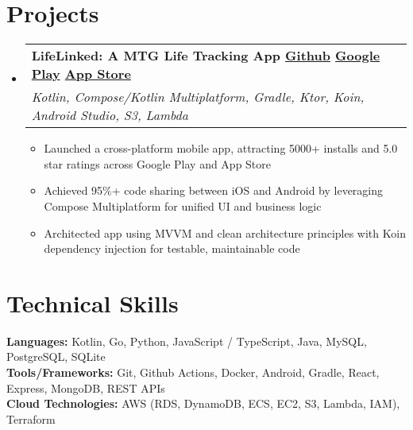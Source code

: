 \documentclass[letterpaper,11pt]{article}
\makeatletter
\newcommand\tab[1][1cm]{\hspace*{#1}}
\newcommand{\resumeItem}[1]{
  \item\small{
    {#1 \vspace{-2.pt}}
  }
}
\newcommand{\resumeSubheading}[4]{
  \vspace{-3pt}\item
    \begin{tabular*}{0.97\textwidth}[t]{l@{\extracolsep{\fill}}r}
    \vspace{-2pt}
      \textbf{#1} & \textit{#2} \\
      \textit{\small#3} & \textit{\small #4} \\
    \end{tabular*}\vspace{-7pt}
}
\newcommand{\resumeSubHeadingListStart}{\begin{itemize}[leftmargin=0.15in, label={}]}
\newcommand{\resumeSubHeadingListEnd}{\end{itemize}}
\newcommand{\resumeItemListStart}{\begin{itemize}}
\newcommand{\resumeItemListEnd}{\end{itemize}\vspace{-5pt}}
\makeatother
\begin{document}
\section{\textbf{Projects}}
  \resumeSubHeadingListStart
       \resumeSubheading
      {LifeLinked: A MTG Life Tracking App \tab[0.5cm] \href{https://github.com/ntietje1/MTG_Life_Total_App}{\raisebox{-0.05\height}\faGithub \tab[0.05cm] Github}\tab[0.5cm] \href{https://play.google.com/store/apps/details?id=com.hypeapps.lifelinked}{\raisebox{-0.05\height}\faGooglePlay \tab[0.05cm] Google Play}\tab[0.5cm] \href{https://apps.apple.com/us/app/lifelinked-mtg-life-counter/id6503708612}{\raisebox{-0.05\height}\faApple \tab[0.05cm] App Store}}{}
      {Kotlin, Compose/Kotlin Multiplatform, Gradle, Ktor, Koin, Android Studio, S3, Lambda}{}
      \resumeItemListStart
        \resumeItem{Launched a cross-platform mobile app, attracting 5000+ installs and 5.0 star ratings across Google Play and App Store}
        \resumeItem{Achieved 95\%+ code sharing between iOS and Android by leveraging Compose Multiplatform for unified UI and business logic}
        \resumeItem{Architected app using MVVM and clean architecture principles with Koin dependency injection for testable, maintainable code}
      \resumeItemListEnd
        \vspace{1pt}
        
  \resumeSubHeadingListEnd


\section{\textbf{Technical Skills}}
 \begin{itemize}[leftmargin=0.15in, label={}]
    \small{\item{
     \textbf{Languages:} \tab[4.18cm] {Kotlin, Go, Python, JavaScript / TypeScript, Java, MySQL, PostgreSQL, SQLite} \\
     \vspace{3pt}
     \textbf{Tools/Frameworks:} \tab[2.975cm] {Git, Github Actions, Docker, Android, Gradle, React, Express, MongoDB, REST APIs} \\
     \vspace{3pt}
     \textbf{Cloud Technologies:} \tab[2.85cm] {AWS (RDS, DynamoDB, ECS, EC2, S3, Lambda, IAM), Terraform} \\
     \vspace{1pt}
    }}
 \end{itemize}
\end{document}
